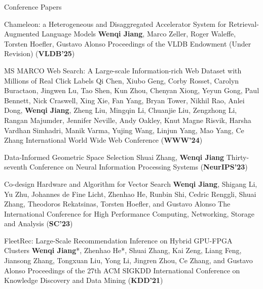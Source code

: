 \begin{rSection}{Conference Papers}
\begin{enumerate}[label={[\arabic*]}]

\item 
\begin{Pub}{Chameleon: a Heterogeneous and Disaggregated Accelerator System for Retrieval-Augmented Language Models}
{\textbf{Wenqi Jiang}, Marco Zeller, Roger Waleffe, Torsten Hoefler, Gustavo Alonso}
{Proceedings of the VLDB Endowment (Under Revision) (\textbf{VLDB'25})}
\end{Pub}

\item 
\begin{Pub}{MS MARCO Web Search: A Large-scale Information-rich Web Dataset with Millions of Real Click Labels}
{Qi Chen, Xiubo Geng, Corby Rosset, Carolyn Buractaon, Jingwen Lu, Tao Shen, Kun Zhou, Chenyan Xiong, Yeyun Gong, Paul Bennett, Nick Craswell, Xing Xie, Fan Yang, Bryan Tower, Nikhil Rao, Anlei Dong, \textbf{Wenqi Jiang}, Zheng Liu, Mingqin Li, Chuanjie Liu, Zengzhong Li, Rangan Majumder, Jennifer Neville, Andy Oakley, Knut Magne Risvik, Harsha Vardhan Simhadri, Manik Varma, Yujing Wang, Linjun Yang, Mao Yang, Ce Zhang}
{International World Wide Web Conference (\textbf{WWW'24})}
\end{Pub}

\item 
\begin{Pub}{Data-Informed Geometric Space Selection}
{Shuai Zhang, \textbf{Wenqi Jiang}}
{Thirty-seventh Conference on Neural Information Processing Systems (\textbf{NeurIPS'23})}
\end{Pub}

\item 
\begin{Pub}{Co-design Hardware and Algorithm for Vector Search}
{\textbf{Wenqi Jiang}, Shigang Li, Yu Zhu, Johannes de Fine Licht, Zhenhao He, Runbin Shi, Cedric Renggli, Shuai Zhang, Theodoros Rekatsinas, Torsten Hoefler, and Gustavo Alonso}
{The International Conference for High Performance Computing, Networking, Storage and Analysis (\textbf{SC'23})}
\end{Pub}

\item 
\begin{Pub}{FleetRec: Large-Scale Recommendation Inference on Hybrid GPU-FPGA Clusters}
{\textbf{Wenqi Jiang}*, Zhenhao He*, Shuai Zhang, Kai Zeng, Liang Feng, Jiansong Zhang, Tongxuan Liu, Yong Li, Jingren Zhou, Ce Zhang, and Gustavo Alonso}
{Proceedings of the 27th ACM SIGKDD International Conference on Knowledge Discovery and Data Mining (\textbf{KDD'21})}
\end{Pub}


\end{enumerate}
\end{rSection}
